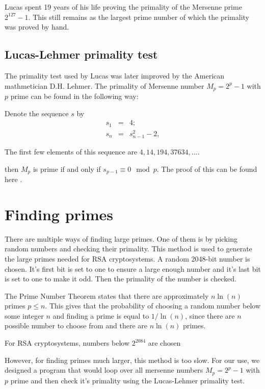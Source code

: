 \documentclass[12pt]{article}
\begin{document}
Lucas spent 19 years of his life proving the primality of the Mersenne prime $2^{127}-1$. This still remains as the largest prime number of which the primality was proved by hand.

\subsection{Lucas-Lehmer primality test}
The primality test used by Lucas was later improved by the American mathmetician D.H. Lehmer. The primality of Mersenne number $M_p = 2^p-1$ with $p$ prime can be found in the following way:

Denote the sequence $s$ by
\begin{eqnarray*}
    s_1 &=& 4; \\
    s_n &=& s_{n-1}^2-2,
\end{eqnarray*}

The first few elements of this sequence are $4, 14, 194, 37634, \dots$.

then $M_p$ is prime if and only if $s_{p-1} \equiv 0 \mod{p}$. The proof of this can be found here \cite{LucasLehmerPrimalityTestProof}.

\section{Finding primes}
There are multiple ways of finding large primes. One of them is by picking random numbers and checking their primality. This method is used to generate the large primes needed for RSA cryptosystems. A random 2048-bit number is chosen. It's first bit is set to one to ensure a large enough number and it's last bit is set to one to make it odd. Then the primality of the number is checked. 


The Prime Number Theorem \cite{PrimeNumberTheorem} states that there are approximately $n\ln(n)$ primes $p \leq n$. This gives that the probability of choosing a random number below some integer $n$ and finding a prime is equal to $1/\ln(n)$, since there are $n$ possible number to choose from and there are $n \ln (n)$ primes. 

For RSA cryptosystems, numbers below $2^{2084}$ are chosen 

However, for finding primes much larger, this method is too slow. For our use, we designed a program that would loop over all mersenne numbers $M_p = 2^p-1$ with $p$ prime and then check it's primality using the Lucas-Lehmer primality test. 

\newpage


\end{document}
